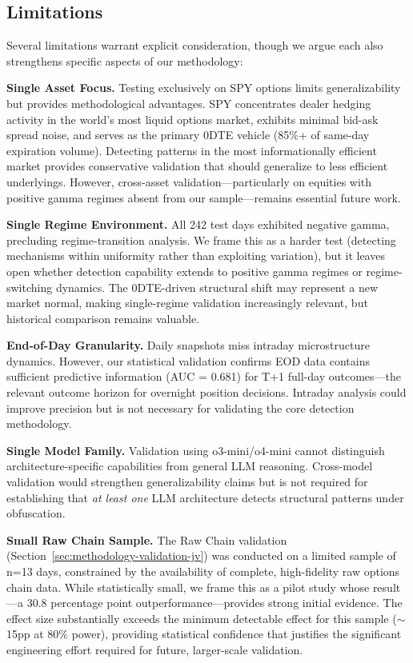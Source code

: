 \subsection{Limitations}

Several limitations warrant explicit consideration, though we argue each also strengthens specific aspects of our methodology:

\textbf{Single Asset Focus.} Testing exclusively on SPY options limits generalizability but provides methodological advantages. SPY concentrates dealer hedging activity in the world's most liquid options market, exhibits minimal bid-ask spread noise, and serves as the primary 0DTE vehicle (85\%+ of same-day expiration volume). Detecting patterns in the most informationally efficient market provides conservative validation that should generalize to less efficient underlyings. However, cross-asset validation—particularly on equities with positive gamma regimes absent from our sample—remains essential future work.

\textbf{Single Regime Environment.} All 242 test days exhibited negative gamma, precluding regime-transition analysis. We frame this as a harder test (detecting mechanisms within uniformity rather than exploiting variation), but it leaves open whether detection capability extends to positive gamma regimes or regime-switching dynamics. The 0DTE-driven structural shift may represent a new market normal, making single-regime validation increasingly relevant, but historical comparison remains valuable.

\textbf{End-of-Day Granularity.} Daily snapshots miss intraday microstructure dynamics. However, our statistical validation confirms EOD data contains sufficient predictive information (AUC = 0.681) for T+1 full-day outcomes—the relevant outcome horizon for overnight position decisions. Intraday analysis could improve precision but is not necessary for validating the core detection methodology.

\textbf{Single Model Family.} Validation using o3-mini/o4-mini cannot distinguish architecture-specific capabilities from general LLM reasoning. Cross-model validation would strengthen generalizability claims but is not required for establishing that \textit{at least one} LLM architecture detects structural patterns under obfuscation.

\textbf{Small Raw Chain Sample.} The Raw Chain validation (Section~\ref{sec:methodology-validation-jv}) was conducted on a limited sample of n=13 days, constrained by the availability of complete, high-fidelity raw options chain data. While statistically small, we frame this as a pilot study whose result—a 30.8 percentage point outperformance—provides strong initial evidence. The effect size substantially exceeds the minimum detectable effect for this sample ($\sim$15pp at 80\% power), providing statistical confidence that justifies the significant engineering effort required for future, larger-scale validation.


